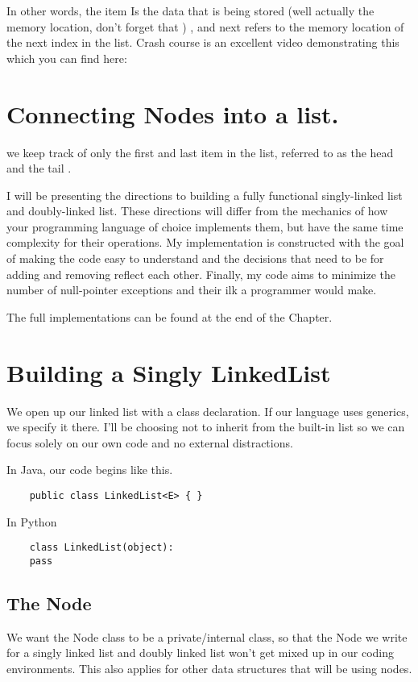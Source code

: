 In other words, the item Is the data that is being stored (well actually the memory location, don't forget that ) , and next refers to the memory location of the next index in the list.  Crash course is an excellent video demonstrating this which you can find here: %


\section{Connecting Nodes into a list.}





we keep track of only the first and last item in the list, referred to as the head and the tail . 


I will be presenting the directions to building a fully functional  singly-linked list and doubly-linked list.  
These directions will differ from the mechanics of how your programming language of choice implements them, but have the same time complexity for their operations.
My implementation is constructed with the goal of making the code easy to understand and the decisions that need to be for adding and removing reflect each other.
Finally, my code aims to minimize the number of null-pointer exceptions and their ilk a programmer would make.

The full implementations can be found at the end of the Chapter.

\section{Building a Singly LinkedList}
We open up our linked list with a class declaration. 
If our language uses generics, we specify it there.
I'll be choosing not to inherit from the built-in list so we can focus solely on our own code and no external distractions.


In Java, our code begins like this.
\begin{verbatim}
	public class LinkedList<E> { }
\end{verbatim}


In Python
\begin{verbatim}
	class LinkedList(object):
	pass
\end{verbatim}


\subsection{The Node}
We want the Node class to be a private/internal class, so that the Node we write for a singly linked list and doubly linked list won't get mixed up in our coding environments.
This also applies for other data structures that will be using nodes.


